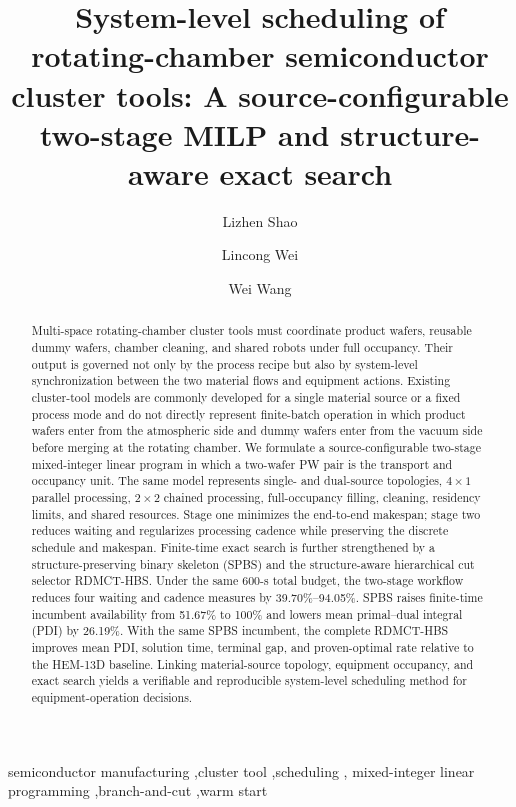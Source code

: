 \documentclass[final,5p,times,twocolumn]{elsarticle}
\begin{document}
\begin{frontmatter}

\title{System-level scheduling of rotating-chamber semiconductor cluster tools:
A source-configurable two-stage MILP and structure-aware exact search}

\author[ustb]{Lizhen Shao}
\author[ustb]{Lincong Wei}
\author[ustb]{Wei Wang}
\address[ustb]{Department of Control Science and Engineering, University of
Science and Technology Beijing, No. 30 Xueyuan Road, Haidian District,
Beijing 100083, China}

\begin{abstract}
Multi-space rotating-chamber cluster tools must coordinate product wafers,
reusable dummy wafers, chamber cleaning, and shared robots under full
occupancy. Their output is governed not only by the process recipe but also by
system-level synchronization between the two material flows and equipment
actions. Existing cluster-tool models are commonly developed for a single
material source or a fixed process mode and do not directly represent
finite-batch operation in which product wafers enter from the atmospheric side
and dummy wafers enter from the vacuum side before merging at the rotating
chamber. We formulate a source-configurable two-stage mixed-integer linear
program in which a two-wafer PW pair is the transport and occupancy unit. The
same model represents single- and dual-source topologies, $4\times1$ parallel
processing, $2\times2$ chained processing, full-occupancy filling, cleaning,
residency limits, and shared resources. Stage one minimizes the end-to-end
makespan; stage two reduces waiting and regularizes processing cadence while
preserving the discrete schedule and makespan. Finite-time exact search is
further strengthened by a structure-preserving binary skeleton (SPBS) and the
structure-aware hierarchical cut selector RDMCT-HBS. Under the same 600-s
total budget, the two-stage workflow reduces four waiting and cadence measures
by 39.70\%--94.05\%. SPBS raises finite-time incumbent availability from
51.67\% to 100\% and lowers mean primal--dual integral (PDI) by 26.19\%.
With the same SPBS incumbent, the complete RDMCT-HBS improves mean PDI,
solution time, terminal gap, and proven-optimal rate relative to the HEM-13D
baseline. Linking material-source topology, equipment occupancy, and exact
search yields a verifiable and reproducible system-level scheduling method for
equipment-operation decisions.
\end{abstract}

\begin{keyword}
semiconductor manufacturing \sep cluster tool \sep scheduling \sep
mixed-integer linear programming \sep branch-and-cut \sep warm start
\end{keyword}

\end{frontmatter}
\end{document}

